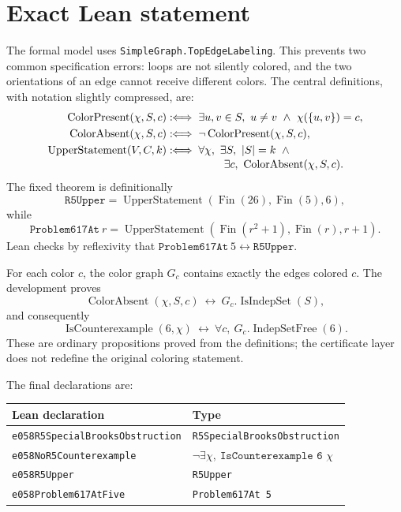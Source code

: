 \documentclass[11pt,reqno,a4paper]{amsart}
\theoremstyle{definition}
\theoremstyle{remark}
\newcommand{\Fin}{\operatorname{Fin}}
\newcommand{\IndepFree}{\operatorname{IndepSetFree}}
\newcommand{\code}[1]{\texttt{#1}}
\begin{document}
\section{Exact Lean statement}

The formal model uses
\code{SimpleGraph.TopEdgeLabeling}.  This prevents two common specification
errors: loops are not silently colored, and the two orientations of an edge
cannot receive different colors.  The central definitions, with notation
slightly compressed, are:
\begin{align*}
  \operatorname{ColorPresent}(\chi,S,c)
    &:\!\!\iff \exists u,v\in S,\ u\ne v\ \wedge\ \chi(\{u,v\})=c,\\
  \operatorname{ColorAbsent}(\chi,S,c)
    &:\!\!\iff \neg\operatorname{ColorPresent}(\chi,S,c),\\
  \operatorname{UpperStatement}(V,C,k)
    &:\!\!\iff \forall\chi,\ \exists S,\ |S|=k\ \wedge{}\\[-2pt]
    &\hspace{5.2em}\exists c,\ \operatorname{ColorAbsent}(\chi,S,c).
\end{align*}
The fixed theorem is definitionally
\[
 \code{R5Upper}
 =\operatorname{UpperStatement}(\Fin(26),\Fin(5),6),
\]
while
\[
 \code{Problem617At}\ r
 =\operatorname{UpperStatement}(\Fin(r^2+1),\Fin(r),r+1).
\]
Lean checks by reflexivity that
\(\code{Problem617At}\ 5\leftrightarrow\code{R5Upper}\).

For each color \(c\), the color graph \(G_c\) contains exactly the edges
colored \(c\).  The development proves
\[
 \operatorname{ColorAbsent}(\chi,S,c)
 \ \longleftrightarrow\
 G_c.\operatorname{IsIndepSet}(S),
\]
and consequently
\[
 \operatorname{IsCounterexample}(6,\chi)
 \ \longleftrightarrow\
 \forall c,\ G_c.\IndepFree(6).
\]
These are ordinary propositions proved from the definitions; the
certificate layer does not redefine the original coloring statement.

The final declarations are:
\begin{center}
\begin{tabular}{@{}ll@{}}
\toprule
Lean declaration & Type\\
\midrule
\code{e058R5SpecialBrooksObstruction}
  & \code{R5SpecialBrooksObstruction}\\
\code{e058NoR5Counterexample}
  & \(\neg\exists\chi,\ \code{IsCounterexample 6 }\chi\)\\
\code{e058R5Upper}
  & \code{R5Upper}\\
\code{e058Problem617AtFive}
  & \code{Problem617At 5}\\
\bottomrule
\end{tabular}
\end{center}
\end{document}
